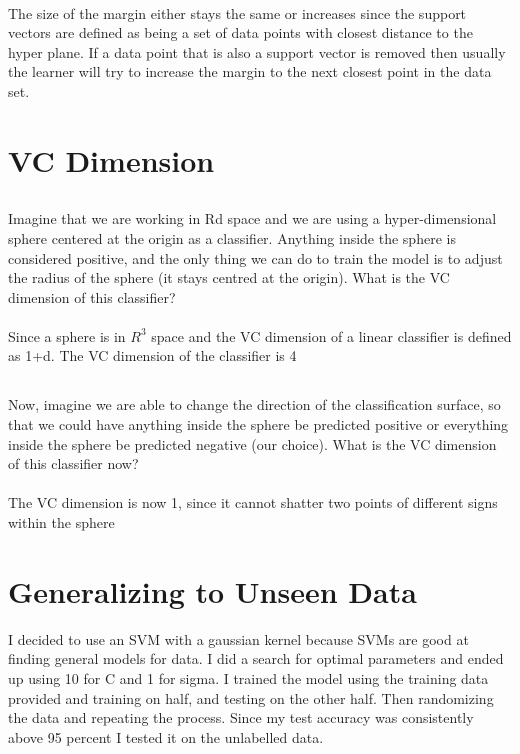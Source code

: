 \documentclass{article}
\begin{document}
\paragraph{}
The size of the margin either stays the same or increases since the support vectors are defined as being a set of data points with closest distance to the hyper plane. If a data point that is also a support vector is removed then usually the learner will try to increase the margin to the next closest point in the data set. 
\section{VC Dimension}
\subsection{}
 Imagine that we are working in Rd space and we are using a hyper-dimensional sphere centered at the
origin as a classifier. Anything inside the sphere is considered positive, and the only thing we can do to train the model is to adjust the radius of the sphere (it stays centred at the origin). What is the VC dimension
of this classifier?
\paragraph{}
Since a sphere is in $R^3$ space and the VC dimension of a linear classifier is defined as 1+d. The VC dimension of the classifier is 4
\subsection{}
 Now, imagine we are able to change the direction of the classification surface, so that we could have
anything inside the sphere be predicted positive or everything inside the sphere be predicted negative (our
choice). What is the VC dimension of this classifier now?
\paragraph{}
The VC dimension is now 1, since it cannot shatter two points of different signs within the sphere

\section{Generalizing to Unseen Data}
I decided to use an SVM with a gaussian kernel because SVMs are good at finding general models for data. I did a search for optimal parameters and ended up using 10 for C and 1 for sigma.  I trained the model using the training data provided and training on half, and testing on the other half. Then randomizing the data and repeating the process. Since my test accuracy was consistently above 95 percent I tested it on the unlabelled data.
\end{document}
